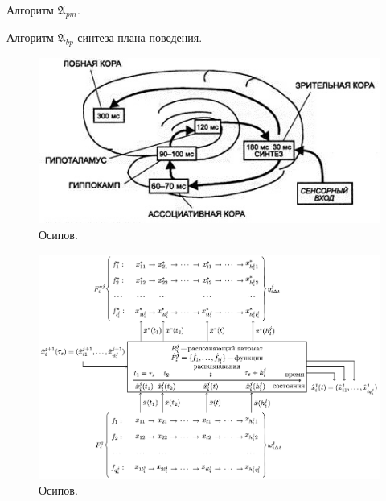 \documentclass[a4paper, 12pt]{article}
\theoremstyle{break}
\newcommand{\stretchsize}{2}
\renewcommand{\baselinestretch}{\stretchsize}
\numberwithin{equation}{section}
\begin{document}
	\begin{algorithm}[p]
		\caption{Алгоритм $\mathfrak{A}_{pm}$.}
		\label{alg:cycle_pm}
		\begin{algorithmic}[1]
			
			
		\end{algorithmic}		
	\end{algorithm}

	\begin{algorithm}[p]
		\caption{Алгоритм $\mathfrak{A}_{bp}$ синтеза плана поведения.}\label{alg:beh_plan}
		\begin{algorithmic}[1]
			
		\end{algorithmic}
	\end{algorithm}
	\renewcommand{\baselinestretch}{\stretchsize}	

	\begin{figure}[p]
		\centering
		\includegraphics[width=0.7\linewidth]{ivanitsky_cyrcle.jpg}
		\caption{Осипов.}
		\label{fig:ivan_cyrcle}
	\end{figure}

	\begin{figure}[h]
		\centering
		\includegraphics[width=1.0\linewidth]{rb_io-0.jpg}
		\caption{Осипов.}
		\label{fig:rb_io}
	\end{figure}	
\end{document}
